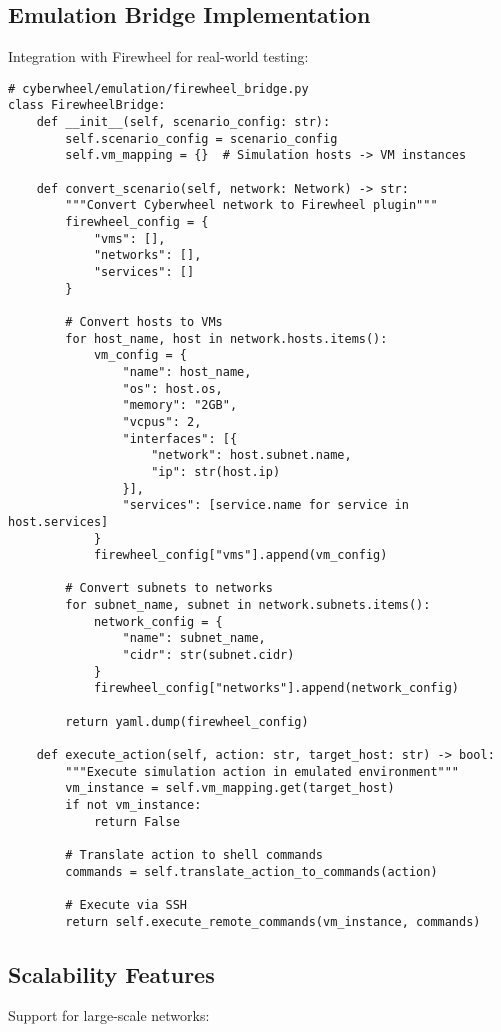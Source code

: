\documentclass[12pt,a4paper]{article}
\begin{document}
\subsection{Emulation Bridge Implementation}
Integration with Firewheel for real-world testing:

\begin{lstlisting}[caption=Firewheel Emulation Integration]
# cyberwheel/emulation/firewheel_bridge.py
class FirewheelBridge:
    def __init__(self, scenario_config: str):
        self.scenario_config = scenario_config
        self.vm_mapping = {}  # Simulation hosts -> VM instances
        
    def convert_scenario(self, network: Network) -> str:
        """Convert Cyberwheel network to Firewheel plugin"""
        firewheel_config = {
            "vms": [],
            "networks": [],
            "services": []
        }
        
        # Convert hosts to VMs
        for host_name, host in network.hosts.items():
            vm_config = {
                "name": host_name,
                "os": host.os,
                "memory": "2GB",
                "vcpus": 2,
                "interfaces": [{
                    "network": host.subnet.name,
                    "ip": str(host.ip)
                }],
                "services": [service.name for service in host.services]
            }
            firewheel_config["vms"].append(vm_config)
            
        # Convert subnets to networks
        for subnet_name, subnet in network.subnets.items():
            network_config = {
                "name": subnet_name,
                "cidr": str(subnet.cidr)
            }
            firewheel_config["networks"].append(network_config)
            
        return yaml.dump(firewheel_config)
    
    def execute_action(self, action: str, target_host: str) -> bool:
        """Execute simulation action in emulated environment"""
        vm_instance = self.vm_mapping.get(target_host)
        if not vm_instance:
            return False
            
        # Translate action to shell commands
        commands = self.translate_action_to_commands(action)
        
        # Execute via SSH
        return self.execute_remote_commands(vm_instance, commands)
\end{lstlisting}

\subsection{Scalability Features}
Support for large-scale networks:
\end{document}
